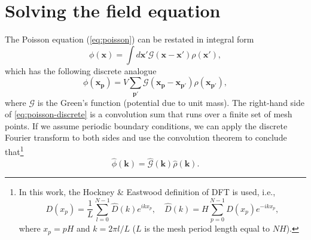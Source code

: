 \section{Solving the field equation}\label{sec:solving-the-field-equation}
The Poisson equation (\autoref{eq:poisson}) can be restated in integral form
\begin{equation*}
    \phi(\mathbf{x}) = \int d\mathbf{x}' \mathcal{G}(\mathbf{x}-\mathbf{x}')\rho(\mathbf{x}'),
\end{equation*}
which has the following discrete analogue
\begin{equation}\label{eq:poisson-discrete}
    \phi(\mathbf{x}_\mathbf{p}) = V \sum_{\mathbf{p}'} \mathcal{G}(\mathbf{x}_\mathbf{p} - \mathbf{x}_{\mathbf{p}'}) \rho(\mathbf{x}_{\mathbf{p}'}),
\end{equation}
where $\mathcal{G}$ is the Green's function (potential due to unit mass).
The right-hand side of \autoref{eq:poisson-discrete} is a convolution sum that runs over a finite set of mesh points.
If we assume periodic boundary conditions, we can apply the discrete Fourier transform to both sides and use the convolution theorem to conclude that\footnote{
    In this work, the Hockney \& Eastwood definition of DFT is used, i.e.,
    \begin{equation*}
        D(x_p) = \frac{1}{L}\sum_{l=0}^{N-1}\hat{D}(k)e^{ikx_p}, \quad \hat{D}(k) = H\sum_{p=0}^{N-1}D(x_p)e^{-ikx_p},
    \end{equation*}
    where $x_p = pH$ and $k=2\pi l / L$ ($L$ is the mesh period length equal to $NH$).
}
\begin{equation}\label{eq:poisson-fourier-product}
    \hat{\phi}(\mathbf{k}) = \hat{\mathcal{G}}(\mathbf{k}) \hat{\rho}(\mathbf{k}).
\end{equation}

